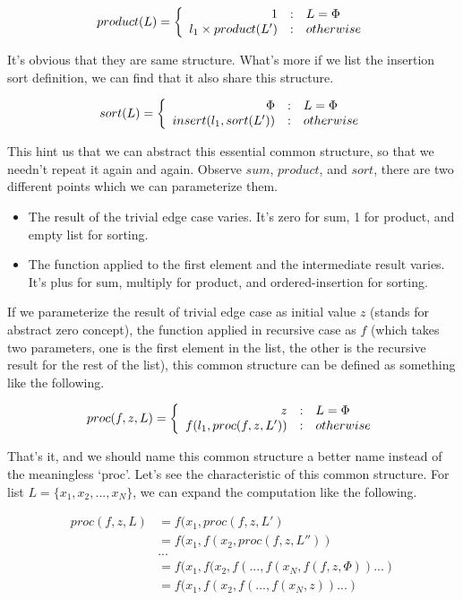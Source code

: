 \documentclass{article}
\begin{document}
\[
product(L) = \left \{
  \begin{array}
  {r@{\quad:\quad}l}
  1 & L = \Phi \\
  l_1 \times product(L') & otherwise
  \end{array}
\right.
\]

It's obvious that they are same structure. What's more if we list the insertion sort definition, we can
find that it also share this structure.

\[
sort(L) = \left \{
  \begin{array}
  {r@{\quad:\quad}l}
  \Phi & L = \Phi \\
  insert(l_1, sort(L')) & otherwise
  \end{array}
\right.
\]

This hint us that we can abstract this essential common structure, so that we needn't repeat it again and again.
Observe $sum$, $product$, and $sort$, there are two different points which we can parameterize them.

\begin{itemize}
\item The result of the trivial edge case varies. It's zero for sum, 1 for product, and empty list for sorting.
\item The function applied to the first element and the intermediate result varies. It's plus for sum, multiply for product,
and ordered-insertion for sorting.
\end{itemize}

If we parameterize the result of trivial edge case as initial value $z$ (stands for abstract zero concept), the
function applied in recursive case as $f$ (which takes two parameters, one is the first element in the list, 
the other is the recursive result for the rest of the list), this common structure can be defined as something
like the following.

\[
proc(f, z, L) = \left \{
  \begin{array}
  {r@{\quad:\quad}l}
  z & L = \Phi \\
  f(l_1, proc(f, z, L')) & otherwise
  \end{array}
\right.
\]

That's it, and we should name this common structure a better name instead of the meaningless `proc'. Let's
see the characteristic of this common structure. For list $L = \{x_1, x_2, ..., x_N \}$, we can expand the 
computation like the following.

\[
\begin{array}{rl}
proc(f, z, L) & = f(x_1, proc(f, z, L') \\
        & = f(x_1, f(x_2, proc(f, z, L'')) \\
        & ... \\
        & = f(x_1, f(x_2, f(..., f(x_N, f(f, z, \Phi))...) \\
        & = f(x_1, f(x_2, f(..., f(x_N, z))...)
\end{array}
\]
\end{document}
